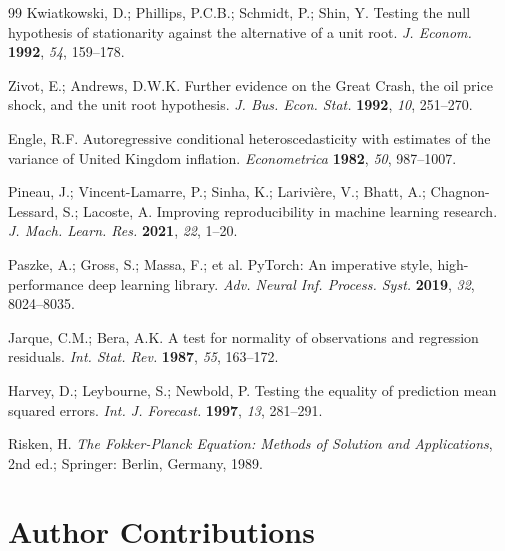 \documentclass[11pt,a4paper]{article}  %
\theoremstyle{plain}
\theoremstyle{definition}
\theoremstyle{remark}
\begin{document}
\begin{thebibliography}{99}
Kwiatkowski, D.; Phillips, P.C.B.; Schmidt, P.; Shin, Y.
Testing the null hypothesis of stationarity against the
alternative of a unit root.
\textit{J. Econom.} \textbf{1992}, \textit{54}, 159--178.

Zivot, E.; Andrews, D.W.K. Further evidence on the Great Crash,
the oil price shock, and the unit root hypothesis.
\textit{J. Bus. Econ. Stat.} \textbf{1992}, \textit{10}, 251--270.

Engle, R.F. Autoregressive conditional heteroscedasticity with
estimates of the variance of United Kingdom inflation.
\textit{Econometrica} \textbf{1982}, \textit{50}, 987--1007.

Pineau, J.; Vincent-Lamarre, P.; Sinha, K.; Larivi\`{e}re, V.;
Bhatt, A.; Chagnon-Lessard, S.; Lacoste, A. Improving reproducibility
in machine learning research.
\textit{J. Mach. Learn. Res.} \textbf{2021}, \textit{22}, 1--20.

Paszke, A.; Gross, S.; Massa, F.; et al. PyTorch: An imperative
style, high-performance deep learning library.
\textit{Adv. Neural Inf. Process. Syst.} \textbf{2019}, \textit{32},
8024--8035.

Jarque, C.M.; Bera, A.K. A test for normality of observations and
regression residuals.
\textit{Int. Stat. Rev.} \textbf{1987}, \textit{55}, 163--172.

Harvey, D.; Leybourne, S.; Newbold, P. Testing the equality of
prediction mean squared errors.
\textit{Int. J. Forecast.} \textbf{1997}, \textit{13}, 281--291.

Risken, H. \textit{The Fokker-Planck Equation: Methods of Solution
and Applications}, 2nd ed.; Springer: Berlin, Germany, 1989.

\end{thebibliography}


\section*{Author Contributions}
\end{document}
